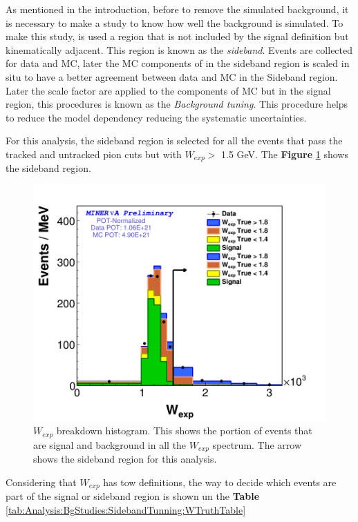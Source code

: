 As mentioned in the introduction, before to remove the simulated background, it is necessary to make a study to know how well the background is simulated. To make this study, is used a region that is not included by the signal definition but kinematically adjacent. This region is known as the \textit{sideband}. Events are collected for data and MC, later the MC components of in the sideband region is scaled in situ to have a better agreement between data and MC in the Sideband region. Later the scale factor are applied to the components of MC but in the signal region, this procedures is known as the \textit{Background tuning}. This procedure helps to reduce the model dependency reducing  the systematic uncertainties. 

For this analysis, the sideband region is selected for all the events that pass the tracked and untracked pion cuts but with $W_{exp} > $ 1.5 GeV. The \textbf{Figure} \ref{fig:Analysis:BgStudies:SidebandTunning:BreakdownWSideband} shows the sideband region. 

\begin{figure}
    \centering
    \includegraphics[scale=0.3]{Figures/Chapter4/BGStudies/Breakdown_WSideband_wexp_fit_1Pi_PN_.png}
    \caption{$W_{exp}$ breakdown histogram. This  shows the portion of events that are signal and background in all the $W_{exp}$ spectrum. The arrow shows the sideband region for this analysis.}
    \label{fig:Analysis:BgStudies:SidebandTunning:BreakdownWSideband} 
\end{figure}

Considering that $W_{exp}$ has tow definitions, the way to decide which events are part of the signal or sideband region is shown un the \textbf{Table} \ref{tab:Analysis:BgStudies:SidebandTunning:WTruthTable}


